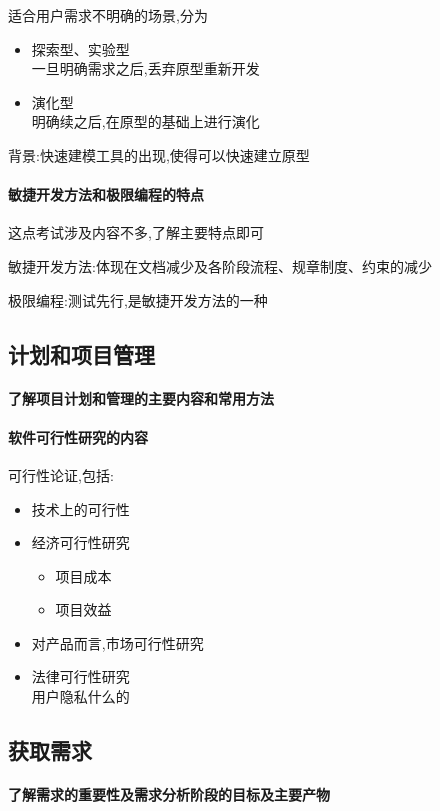 \documentclass[UTF8,a4paper]{ctexart}
\begin{document}
适合用户需求不明确的场景,分为
\begin{itemize}
  \item 探索型、实验型\\
  一旦明确需求之后,丢弃原型重新开发
  \item 演化型\\
  明确续之后,在原型的基础上进行演化
\end{itemize}

背景:快速建模工具的出现,使得可以快速建立原型

\paragraph{敏捷开发方法和极限编程的特点}这点考试涉及内容不多,了解主要特点即可

敏捷开发方法:体现在文档减少及各阶段流程、规章制度、约束的减少

极限编程:测试先行,是敏捷开发方法的一种

\subsection{计划和项目管理}
\paragraph{了解项目计划和管理的主要内容和常用方法}

\paragraph{软件可行性研究的内容}
可行性论证,包括:
\begin{itemize}
  \item 技术上的可行性
  \item 经济可行性研究
  \begin{itemize}
    \item 项目成本
    \item 项目效益
  \end{itemize}
  \item 对产品而言,市场可行性研究
  \item 法律可行性研究\\
  用户隐私什么的
\end{itemize}

\subsection{获取需求}

\paragraph{了解需求的重要性及需求分析阶段的目标及主要产物}
\end{document}
